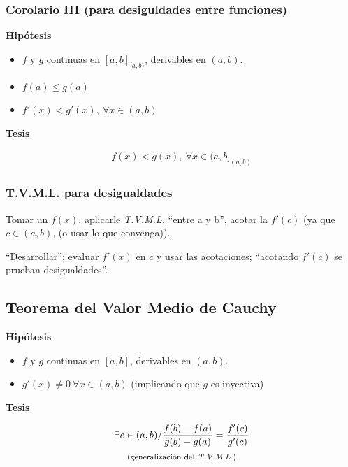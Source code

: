 \documentclass[11pt,titlepage]{article}
\newcommand{\littleTitle}[1]{
	\noindent \ignorespaces
	\small \textbf{#1} \normalsize
	\ignorespaces \ignorespacesafterend
}
\newcommand{\comillas}[1]{``#1''}
\begin{document}
\subsubsection{Corolario III \footnotesize{(para desiguldades entre funciones)}}
\begin{commBoxy}
	\littleTitle{Hipótesis}
	\begin{itemize}
		\item $f$ y $g$ continuas en ${[a,b]}_{[a,b)}$, derivables en $(a,b)$.
		\item $f(a) \leq g(a)$
		\item $f'(x) < g'(x), \ \forall x \in (a,b)$
	\end{itemize}

	\littleTitle{Tesis}
	\begin{gather*}
		f(x) < g(x), \ \forall x \in {(a,b]}_{(a,b)}
	\end{gather*}
\end{commBoxy}

\subsubsection{T.V.M.L. para desigualdades}
Tomar un $f(x)$, aplicarle \hyperref[tvml]{\emph{T.V.M.L.}} \comillas{entre a y b}, acotar la $f'(c)$ (ya que $c \in (a,b)$, (o 
usar lo que convenga)).\par
\comillas{Desarrollar}; evaluar $f'(x)$ en $c$ y usar las acotaciones; \comillas{acotando $f'(c)$ se prueban 
desigualdades}.

\subsection{Teorema del Valor Medio de Cauchy}
\begin{commBoxy}
	\littleTitle{Hipótesis}
	\begin{itemize}
		\item $f$ y $g$ continuas en $[a,b]$, derivables en $(a,b)$.
		\item $g'(x) \neq 0 \ \forall x \in (a,b)$ \footnotesize(implicando que $g$ es inyectiva)
	\end{itemize}

	\littleTitle{Tesis}
	\begin{gather*}
		\exists c \in (a,b) / \frac{f(b) - f(a)}{g(b) - g(a)} = \frac{f'(c)}{g'(c)} \\ 
		\text{\footnotesize (generalización del \emph{T.V.M.L.})}
	\end{gather*}
\end{commBoxy}
\end{document}
